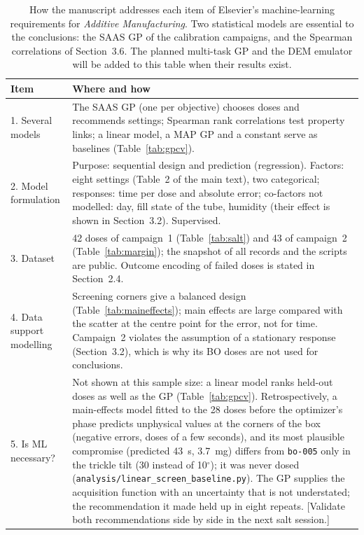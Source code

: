 \documentclass[11pt]{article}
\newcommand{\ph}[1]{\textcolor{orange!75!black}{\textsf{[#1]}}}
\begin{document}
\begin{table}[p]
\centering
\caption{How the manuscript addresses each item of Elsevier's machine-learning requirements for
\emph{Additive Manufacturing}. Two statistical models are essential to the conclusions: the SAAS GP of
the calibration campaigns, and the Spearman correlations of Section~3.6. The planned multi-task GP and
the DEM emulator will be added to this table when their results exist.}
\label{tab:mlrubric}
\small
\begin{tabularx}{\textwidth}{@{}p{3.6cm}X@{}}
\toprule
Item & Where and how \\
\midrule
1. Several models & The SAAS GP (one per objective) chooses doses and recommends settings; Spearman rank correlations test property links; a linear model, a MAP GP and a constant serve as baselines (Table~\ref{tab:gpcv}). \\
2. Model formulation & Purpose: sequential design and prediction (regression). Factors: eight settings (Table~2 of the main text), two categorical; responses: time per dose and absolute error; co-factors not modelled: day, fill state of the tube, humidity (their effect is shown in Section~3.2). Supervised. \\
3. Dataset & 42 doses of campaign~1 (Table~\ref{tab:salt}) and 43 of campaign~2 (Table~\ref{tab:margin}); the snapshot of all records and the scripts are public. Outcome encoding of failed doses is stated in Section~2.4. \\
4. Data support modelling & Screening corners give a balanced design (Table~\ref{tab:maineffects}); main effects are large compared with the scatter at the centre point for the error, not for time. Campaign~2 violates the assumption of a stationary response (Section~3.2), which is why its BO doses are not used for conclusions. \\
5. Is ML necessary? & Not shown at this sample size: a linear model ranks held-out doses as well as the GP (Table~\ref{tab:gpcv}). Retrospectively, a main-effects model fitted to the 28 doses before the optimizer's phase predicts unphysical values at the corners of the box (negative errors, doses of a few seconds), and its most plausible compromise (predicted 43~s, 3.7~mg) differs from \texttt{bo-005} only in the trickle tilt (30 instead of 10$^\circ$); it was never dosed (\texttt{analysis/linear\_screen\_baseline.py}). The GP supplies the acquisition function with an uncertainty that is not understated; the recommendation it made held up in eight repeats. \ph{Validate both recommendations side by side in the next salt session.} \\

\end{tabularx}
\end{table}
\end{document}

